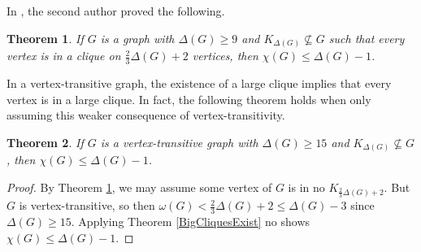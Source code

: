 \documentclass[12pt]{article}
\theoremstyle{plain}
\newtheorem{thm}{Theorem}[section]
\theoremstyle{definition}
\theoremstyle{remark}
\begin{document}
In \cite{denseneighborhoods}, the second author proved the following.
\begin{thm}\label{DenseNeighbors}
If $G$ is a graph with $\Delta(G) \ge 9$ and $K_{\Delta(G)} \not \subseteq G$ such that every vertex is in a clique on $\frac23 \Delta(G) + 2$ vertices, then $\chi(G) \le \Delta(G) - 1$.
\end{thm}

In a vertex-transitive graph, the existence of a large clique implies that every vertex is in a large clique.  In fact, the following theorem holds when only assuming this weaker consequence of vertex-transitivity.
\begin{thm}
If $G$ is a vertex-transitive graph with $\Delta(G) \ge 15$ and $K_{\Delta(G)} \not \subseteq G$, then $\chi(G) \le \Delta(G) - 1$.
\end{thm}
\begin{proof}
By Theorem \ref{DenseNeighbors}, we may assume some vertex of $G$ is in no $K_{\frac23 \Delta(G) + 2}$.  But $G$ is vertex-transitive, so then $\omega(G) < \frac23 \Delta(G) + 2 \le \Delta(G) - 3$ since $\Delta(G) \ge 15$.  Applying Theorem \ref{BigCliquesExist} no shows  $\chi(G) \le \Delta(G) - 1$.
\end{proof}



\end{document}
